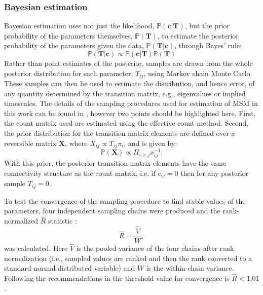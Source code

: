 \subsubsection{Bayesian estimation}
Bayesian estimation \cite{gelmanBayesianDataAnalysis2014} uses not just the likelihood, $\mathbb{P}(\mathbf{c}|\mathbf{T})$, but the prior probability of the parameters themselves, $\mathbb{P}(\mathbf{T})$, to estimate the posterior probability of the parameters given the data, $\mathbb{P}(\mathbf{T}|\mathbf{c})$, through Bayes' rule: 
\begin{equation}
    \mathbb{P}(\mathbf{T}|\mathbf{c}) \propto \mathbb{P}(\mathbf{c}|\mathbf{T})\mathbb{P}(\mathbf{T})
\end{equation}
Rather than point estimates of the posterior, samples are drawn from the whole posterior distribution for each parameter, $T_{ij}$, using Markov chain Monte Carlo\cite{gelmanBayesianDataAnalysis2014}. These samples can then be used to estimate the distribution, and hence error, of any quantity determined by the transition matrix, e.g., eigenvalues or implied timescales. The details of the sampling procedures used for estimation of MSM in this work can be found in \cite{trendelkamp-schroerEstimationUncertaintyReversible2015b}, however two points should be highlighted here. First, the count matrix used are estimated using the effective count method. Second, the prior distribution for the transition matrix elements are defined over a reversible matrix $\mathbf{X}$, where $X_{ij}\propto T_{ij}\pi_{i}$, and is given by: 
\begin{equation}
    \mathbb{P}(\mathbf{X}) \propto \Pi_{i \ge j}x_{ij}^{-1}. 
\end{equation}
With this prior, the posterior transition matrix elements have the same connectivity structure as the count matrix. i.e. if $c_{ij}=0$ then for any posterior sample $T_{ij}=0$. 

To test the convergence of the sampling procedure to find stable values of the parameters, four independent sampling chains were produced and  the rank-normalized $\hat{R}$ statistic \cite{vehtariRanknormalizationFoldingLocalization2020}:
\begin{equation}
    \hat{R} = \frac{\hat{V}}{W}, 
\end{equation}
was calculated. Here $\hat{V}$ is the pooled variance of the four chains after rank normalization (i.e., sampled values are ranked and then the rank converted to a standard normal distributed variable) and $W$ is the within chain variance. Following the recommendations in \cite{vehtariRanknormalizationFoldingLocalization2020} the threshold value for convergence is $\hat{R} < 1.01$. 

